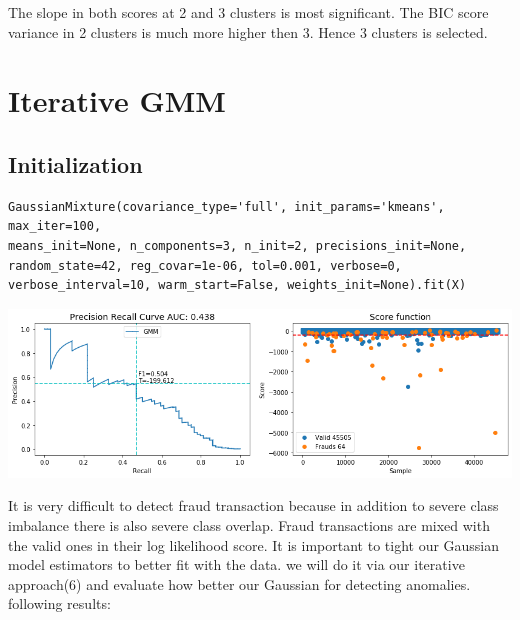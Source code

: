\documentclass[20pt,a4paper]{article}
\begin{document}
The slope in both scores at 2 and 3 clusters is most significant. The BIC score variance in 2 clusters is much more higher then 3. Hence 3 clusters is selected.

\section{Iterative GMM}
\subsection{Initialization}
\begin{verbatim}
GaussianMixture(covariance_type='full', init_params='kmeans', max_iter=100,
means_init=None, n_components=3, n_init=2, precisions_init=None,
random_state=42, reg_covar=1e-06, tol=0.001, verbose=0,
verbose_interval=10, warm_start=False, weights_init=None).fit(X)
\end{verbatim}

\begin{center}
\includegraphics[scale=0.45]{graphs/output_48_0.png}
\end{center}
    
    It is very difficult to detect fraud transaction because in addition to
severe class imbalance there is also severe class overlap. Fraud
transactions are mixed with the valid ones in their log likelihood
score. It is important to tight our Gaussian model estimators to better
fit with the data. we will do it via our iterative approach(6) and
evaluate how better our Gaussian for detecting anomalies.\\
following results:
\end{document}
